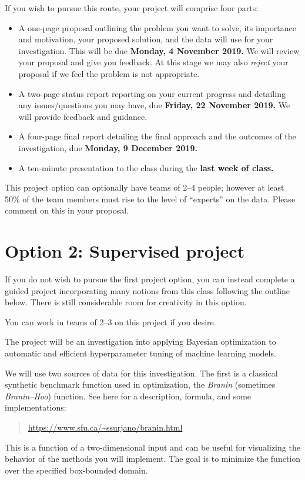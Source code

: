 \documentclass{article}
\begin{document}
If you wish to pursue this route, your project will comprise four parts:

\begin{itemize}
\item
  A one-page proposal outlining the problem you want to solve, its importance
  and motivation, your proposed solution, and the data will use for your
  investigation. This will be due \textbf{Monday, 4 November 2019.} We will
  review your proposal and give you feedback.  At this stage we may also
  \emph{reject} your proposal if we feel the problem is not appropriate.
\item
  A two-page status report reporting on your current progress and detailing any
  issues/questions you may have, due \textbf{Friday, 22 November 2019.}  We will
  provide feedback and guidance.
\item
  A four-page final report detailing the final approach and the outcomes of the
  investigation, due \textbf{Monday, 9 December 2019.}
\item
  A ten-minute presentation to the class during the \textbf{last week of class.}
\end{itemize}

This project option can optionally have teams of 2--4 people; however at least
50\% of the team members must rise to the level of ``experts'' on the
data. Please comment on this in your proposal.

\clearpage

\section*{Option 2: Supervised project}

If you do not wish to pursue the first project option, you can instead complete
a guided project incorporating many notions from this class following the
outline below. There is still considerable room for creativity in this option.

You can work in teams of 2--3 on this project if you desire.

The project will be an investigation into applying Bayesian optimization to
automatic and efficient hyperparameter tuning of machine learning models.

We will use two sources of data for this investigation. The first is a classical
synthetic benchmark function used in optimization, the \emph{Branin} (sometimes
\emph{Branin--Hoo}) function.  See here for a description, formula, and some
implementations:
\begin{quote}
  \url{https://www.sfu.ca/~ssurjano/branin.html}
\end{quote}
This is a function of a two-dimensional input and can be useful for visualizing
the behavior of the methods you will implement. The goal is to minimize the
function over the specified box-bounded domain.
\end{document}
